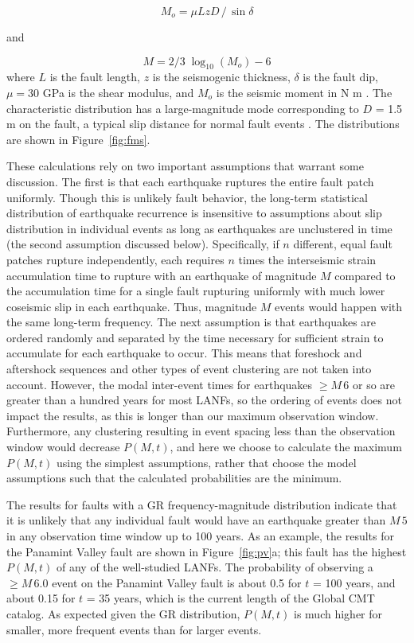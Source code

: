 \documentclass[draft,grl]{AGUTeX}
\begin{document}
\begin{article}
\begin{equation}
 M_o = \mu L z D \,/ \, \sin \delta 
 \end{equation}

and

\begin{equation}
M = 2/3 \; \log_{10} (M_o) - 6
\end{equation}
where $L$ is the fault length, $z$ is the seismogenic thickness, $\delta$ is
the fault dip, $\mu = 30$ GPa is the shear modulus, and $M_o$ is the seismic
moment in N m \citep[e.g.,][]{akirichards2002, kagan2003pepi}.  The
characteristic distribution has a large-magnitude mode corresponding to $D$
= 1.5 m on the fault, a typical slip distance for normal fault events
\citep[e.g.][]{wesnousky2008displacement}.  The distributions are shown in
Figure~\ref{fig:fms}.

These calculations rely on two important assumptions that warrant some
discussion.  The first is that each earthquake ruptures the entire fault patch
uniformly.  Though this is unlikely fault behavior, the long-term statistical
distribution of earthquake recurrence is insensitive to assumptions about slip
distribution in individual events as long as earthquakes are unclustered in
time (the second assumption discussed below).  Specifically, if $n$ different,
equal fault patches rupture independently, each requires $n$ times the
interseismic strain accumulation time to rupture with an earthquake of
magnitude $M$ compared to the accumulation time for a single fault rupturing
uniformly with much lower coseismic slip in each earthquake. Thus, magnitude
$M$ events would happen with the same long-term frequency.  The next assumption
is that earthquakes are ordered randomly and separated by the time necessary
for sufficient strain to accumulate for each earthquake to occur.  This means
that foreshock and aftershock sequences and other types of event clustering are
not taken into account.  However, the modal inter-event times for earthquakes
$\ge M \,6$ or so are greater than a hundred years for most LANFs, so the
ordering of events does not impact the results, as this is longer than our
maximum observation window.  Furthermore, any clustering resulting in event
spacing less than the observation window would decrease $P(M,t)$, and here we
choose to calculate the maximum $P(M,t)$ using the simplest assumptions, rather
that choose the model assumptions such that the calculated probabilities are
the minimum.

The results for faults with a GR frequency-magnitude distribution indicate that
it is unlikely that any individual fault would have an earthquake greater than
$M \, 5$ in any observation time window up to 100 years.  As an example, the
results for the Panamint Valley fault are shown in Figure~\ref{fig:pv}a; this
fault has the highest $P(M,t)$ of any of the well-studied LANFs.  The
probability of observing a $\ge M \, 6.0$ event on the Panamint Valley fault is
about 0.5 for $t$ = 100 years, and about 0.15 for $t$ = 35 years, which is the
current length of the Global CMT catalog. As expected given the GR
distribution, $P(M,t)$ is much higher for smaller, more frequent events
than for larger events.  


\end{article}
\end{document}
